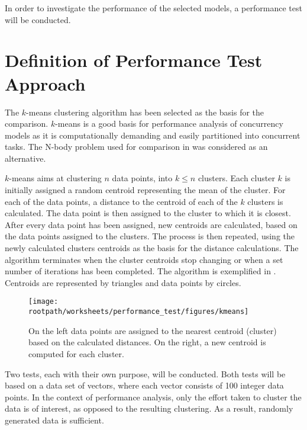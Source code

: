 \makeatletter {}\makeatother
{}

In order to investigate the performance of the selected models, a performance test will be conducted.

\section{Definition of Performance Test Approach}
 The $k$-means clustering algorithm has been selected as the basis for the comparison. $k$-means is a good basis for performance analysis of concurrency models as it is computationally demanding and easily partitioned into concurrent tasks\cite[p. 128]{epstein2011towards}. The N-body problem used for comparison in \cite{totoo2012haskell} was considered as an alternative.

$k$-means aims at clustering $n$ data points, into $k \leq n$ clusters\cite[p. 451]{dataminingconceptsandtechniques}\cite[p. 128]{epstein2011towards}. Each cluster $k$ is initially assigned a random centroid representing the mean of the cluster. For each of the data points, a distance to the centroid of each of the $k$ clusters is calculated. The data point is then assigned to the cluster to which it is closest. After every data point has been assigned, new centroids are calculated, based on the data points assigned to the clusters. The process is then repeated, using the newly calculated clusters centroids as the basis for the distance calculations. The algorithm terminates when the cluster centroids stop changing or when a set number of iterations has been completed\cite[p. 128]{epstein2011towards}. The algorithm is exemplified in . Centroids are represented by triangles and data points by circles.

\begin{figure}[ht!]
\centering
\texttt{[image: \\rootpath/worksheets/performance\_test/figures/kmeans]}
\caption{On the left data points are assigned to the nearest centroid (cluster) based on the calculated distances. On the right, a new centroid is computed for each cluster.}\label{fig:kmeans}
\end{figure}

Two tests, each with their own purpose, will be conducted. Both tests will be based on a data set of vectors, where each vector consists of 100 integer data points. In the context of performance analysis, only the effort taken to cluster the data is of interest, as opposed to the resulting clustering. As a result, randomly generated data is sufficient.


